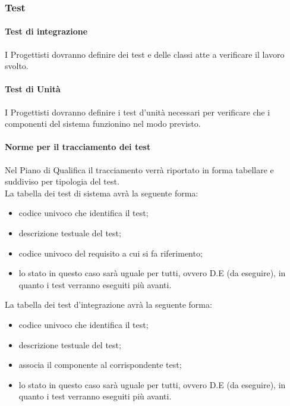 \subsubsection{Test}

\paragraph{Test di integrazione}
\label{}
I Progettisti dovranno definire dei test e delle classi atte a verificare il lavoro svolto.

\paragraph{Test di Unità}
\label{}
I Progettisti dovranno definire i test d'unità necessari per verificare che i componenti del sistema funzionino nel modo previsto.

\paragraph{Norme per il tracciamento dei test}
Nel Piano di Qualifica il tracciamento verrà riportato in forma tabellare e suddiviso per tipologia del test.\\
La tabella dei test di sistema avrà la seguente forma:
\begin{itemize}
\item {}codice univoco che identifica il test;
\item {} descrizione testuale del test;
\item {}codice univoco del requisito a cui si fa riferimento;
\item {}lo stato in questo caso sarà uguale per tutti, ovvero D.E (da eseguire), in quanto i test verranno eseguiti più avanti.
\end{itemize}
La tabella dei test d'integrazione avrà la seguente forma:
\begin{itemize}
\item {}codice univoco che identifica il test;
\item {} descrizione testuale del test;
\item {} associa il componente al corrispondente test;
\item {}lo stato in questo caso sarà uguale per tutti, ovvero D.E (da eseguire), in quanto i test verranno eseguiti più avanti.
\end{itemize}

